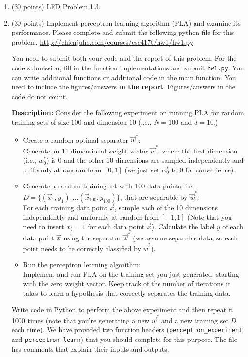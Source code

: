 \documentclass[11pt]{article}
\begin{document}
\begin{enumerate}


\item (30 points) LFD Problem 1.3. 

\item (30 points) 
  Implement perceptron learning algorithm (PLA) and examine its performance. 
  Please complete and submit the following python file for this problem. 
  \url{http://chienjuho.com/courses/cse417t/hw1/hw1.py}
  
  You need to submit both your code and the report of this problem. 
  For the code submission, fill in the function implementations and submit \texttt{hw1.py}. You can write additional functions or additional code in the main function.
  You need to include the figures/answers \textbf{in the report}. Figures/answers in the code do not count.
  
  \textbf{Description:} Consider the following experiment on running PLA for random training sets of size $100$ and dimension $10$ (i.e., $N=100$ and $d=10$.)
  \begin{itemize}
  \item Create a random optimal separator $\vec{w}^*$:\\
    Generate an 11-dimensional weight vector $\vec{w}^*$,
    where the first dimension (i.e., $w^*_0$) is 0 and the other 10 dimensions are
    sampled independently and uniformly at random from $[0,1]$
    (we just set $w^*_0$ to 0 for convenience).
  \item Generate a random training set with 100 data points, i.e., $D=\{(\vec{x}_1,y_1),...(\vec{x}_{100},y_{100})\}$, that are separable by $\vec{w}^*$:\\
  For each training data point $\vec{x}$, sample each of the 10 dimensions independently and uniformly at random from $[-1,1]$ (Note that you need to insert $x_0=1$ for each data point $\vec{x}$).
    Calculate the label $y$ of each data point $\vec{x}$ using the separator $\vec{w}^*$ (we assume separable data, so each point needs to be correctly classified by $\vec{w}^*$).
  \item Run the perceptron learning algorithm:\\ 
    Implement and run PLA on the training set you just generated, 
    starting with the zero weight vector. 
    Keep track of the number of iterations it takes to learn a hypothesis
    that correctly separates the training data. 
  \end{itemize}

  Write code in Python to perform the above experiment and then repeat
  it 1000 times (note that you're generating a new $\vec{w}^*$
  and a new training set $D$ each time). We have provided 
  two function headers (\texttt{perceptron\_experiment} and \texttt{perceptron\_learn}) that you should complete for this
  purpose. The file has comments that explain their inputs and
  outputs. 


\end{enumerate}
\end{document}

